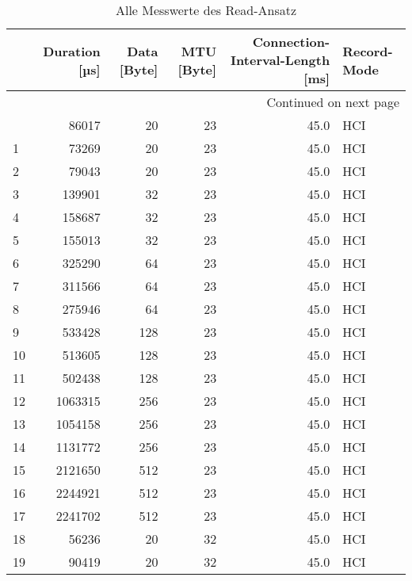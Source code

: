 \begin{longtable}{lrrrrl}
\caption{Alle Messwerte des Read-Ansatz}\label{table:readallvalues}\\
\toprule
{} &  Duration [µs] &  Data [Byte] &  MTU [Byte] &  Connection-Interval-Length [ms] & Record-Mode \\
\midrule
\endhead
\midrule
\multicolumn{6}{r}{{Continued on next page}} \\
\midrule
\endfoot

\bottomrule
\endlastfoot
0   &     86017 &         20 &        23 &           45.0 &  HCI \\
1   &     73269 &         20 &        23 &           45.0 &  HCI \\
2   &     79043 &         20 &        23 &           45.0 &  HCI \\
3   &    139901 &         32 &        23 &           45.0 &  HCI \\
4   &    158687 &         32 &        23 &           45.0 &  HCI \\
5   &    155013 &         32 &        23 &           45.0 &  HCI \\
6   &    325290 &         64 &        23 &           45.0 &  HCI \\
7   &    311566 &         64 &        23 &           45.0 &  HCI \\
8   &    275946 &         64 &        23 &           45.0 &  HCI \\
9   &    533428 &        128 &        23 &           45.0 &  HCI \\
10  &    513605 &        128 &        23 &           45.0 &  HCI \\
11  &    502438 &        128 &        23 &           45.0 &  HCI \\
12  &   1063315 &        256 &        23 &           45.0 &  HCI \\
13  &   1054158 &        256 &        23 &           45.0 &  HCI \\
14  &   1131772 &        256 &        23 &           45.0 &  HCI \\
15  &   2121650 &        512 &        23 &           45.0 &  HCI \\
16  &   2244921 &        512 &        23 &           45.0 &  HCI \\
17  &   2241702 &        512 &        23 &           45.0 &  HCI \\
18  &     56236 &         20 &        32 &           45.0 &  HCI \\
19  &     90419 &         20 &        32 &           45.0 &  HCI \\

\end{longtable}
